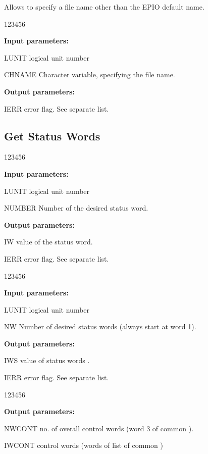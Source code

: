 
Allows to specify a file name other than the EPIO default name.

\begin{DLtt}{123456}
\item[{\rm\bf Input parameters:}]
\item[LUNIT] logical unit number
\item[CHNAME] Character variable, specifying the file name.
\item[{\rm\bf Output parameters:}]
\item[IERR] error flag. See separate list.
\end{DLtt}
 
\subsection{Get Status Words}

\begin{DLtt}{123456}
\item[{\rm\bf Input parameters:}]
\item[LUNIT] logical unit number
\item[NUMBER] Number of the desired status word.
\item[{\rm\bf Output parameters:}]
\item[IW] value of the status word.
\item[IERR] error flag. See separate list.
\end{DLtt}


\begin{DLtt}{123456}
\item[{\rm\bf Input parameters:}]
\item[LUNIT] logical unit number
\item[NW]    Number of desired status words (always start at word 1).
\item[{\rm\bf Output parameters:}]
\item[IWS] value of status words .
\item[IERR] error flag. See separate list.
\end{DLtt}


\begin{DLtt}{123456}
\item[{\rm\bf Output parameters:}]
\item[NWCONT] no. of overall control words (word 3 of common ).
\item[IWCONT] control words (words  
              of list of common )
\end{DLtt}

